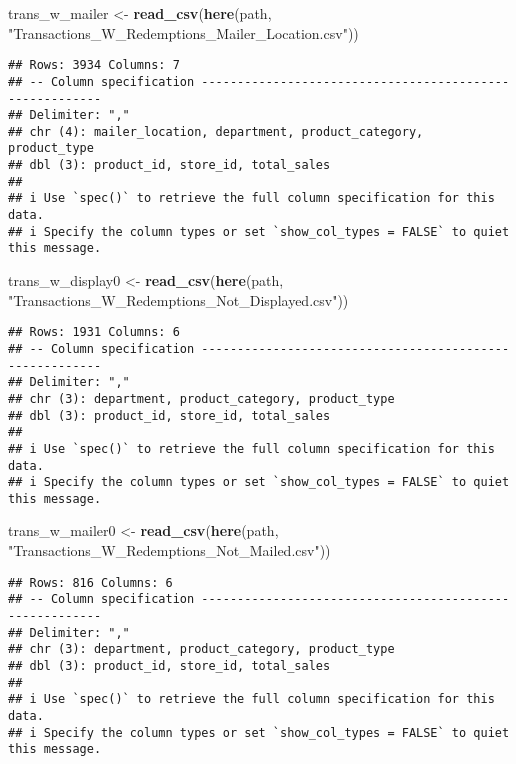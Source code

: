 \documentclass[
]{article}
\newenvironment{Shaded}{\begin{snugshade}}{\end{snugshade}}
\newcommand{\FunctionTok}[1]{\textcolor[rgb]{0.13,0.29,0.53}{\textbf{#1}}}
\newcommand{\NormalTok}[1]{#1}
\newcommand{\OtherTok}[1]{\textcolor[rgb]{0.56,0.35,0.01}{#1}}
\newcommand{\StringTok}[1]{\textcolor[rgb]{0.31,0.60,0.02}{#1}}
\begin{document}
\begin{Shaded}
\begin{Highlighting}[]
\NormalTok{trans\_w\_mailer }\OtherTok{\textless{}{-}} \FunctionTok{read\_csv}\NormalTok{(}\FunctionTok{here}\NormalTok{(path, }\StringTok{"Transactions\_W\_Redemptions\_Mailer\_Location.csv"}\NormalTok{))}
\end{Highlighting}
\end{Shaded}

\begin{verbatim}
## Rows: 3934 Columns: 7
## -- Column specification --------------------------------------------------------
## Delimiter: ","
## chr (4): mailer_location, department, product_category, product_type
## dbl (3): product_id, store_id, total_sales
## 
## i Use `spec()` to retrieve the full column specification for this data.
## i Specify the column types or set `show_col_types = FALSE` to quiet this message.
\end{verbatim}

\begin{Shaded}
\begin{Highlighting}[]
\NormalTok{trans\_w\_display0 }\OtherTok{\textless{}{-}} \FunctionTok{read\_csv}\NormalTok{(}\FunctionTok{here}\NormalTok{(path, }\StringTok{"Transactions\_W\_Redemptions\_Not\_Displayed.csv"}\NormalTok{))}
\end{Highlighting}
\end{Shaded}

\begin{verbatim}
## Rows: 1931 Columns: 6
## -- Column specification --------------------------------------------------------
## Delimiter: ","
## chr (3): department, product_category, product_type
## dbl (3): product_id, store_id, total_sales
## 
## i Use `spec()` to retrieve the full column specification for this data.
## i Specify the column types or set `show_col_types = FALSE` to quiet this message.
\end{verbatim}

\begin{Shaded}
\begin{Highlighting}[]
\NormalTok{trans\_w\_mailer0 }\OtherTok{\textless{}{-}} \FunctionTok{read\_csv}\NormalTok{(}\FunctionTok{here}\NormalTok{(path, }\StringTok{"Transactions\_W\_Redemptions\_Not\_Mailed.csv"}\NormalTok{))}
\end{Highlighting}
\end{Shaded}

\begin{verbatim}
## Rows: 816 Columns: 6
## -- Column specification --------------------------------------------------------
## Delimiter: ","
## chr (3): department, product_category, product_type
## dbl (3): product_id, store_id, total_sales
## 
## i Use `spec()` to retrieve the full column specification for this data.
## i Specify the column types or set `show_col_types = FALSE` to quiet this message.
\end{verbatim}
\end{document}
